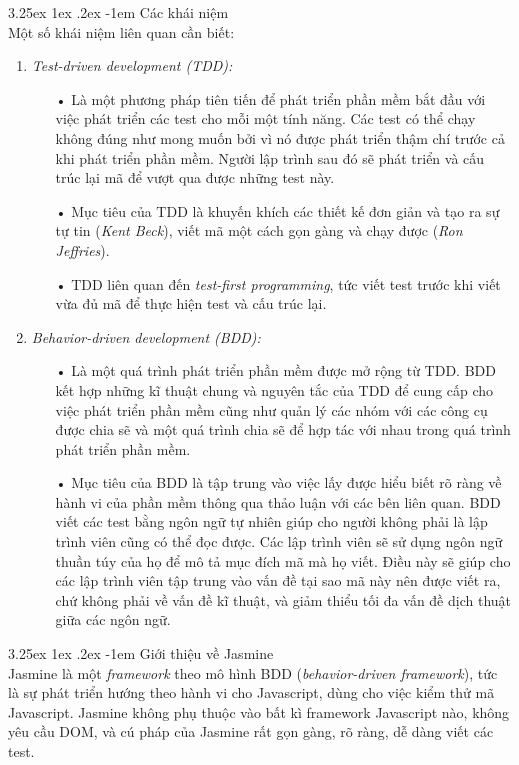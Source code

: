 \documentclass[12pt,a4paper,twoside]{article}
\makeatletter
\let\newcounter\@gobble\let\setcounter\@gobbletwo
\newcommand{\myparagraph}[1]{\paragraph{#1}\mbox{}\\} %
\newcounter{subsubsubsection}[subsubsection]
\renewcommand\paragraph{\@startsection{paragraph}{5}{\z@}%
  {3.25ex \@plus1ex \@minus.2ex}%
  {-1em}%
  {\normalfont\normalsize\bfseries}}
\makeatother
\begin{document}
\myparagraph{Các khái niệm}
Một số khái niệm liên quan cần biết:
\begin{enumerate}
\item \emph{Test-driven development (TDD)\cite{tdd_1}:}
\begin{itemize}
\item[•] Là một phương pháp tiên tiến để phát triển phần mềm bắt đầu với việc phát triển các test cho mỗi một tính năng. Các test có thể chạy không đúng như mong muốn bởi vì nó được phát triển thậm chí trước cả khi phát triển phần mềm. Người lập trình sau đó sẽ phát triển và cấu trúc lại mã để vượt qua được những test này. 
\item[•] Mục tiêu của TDD là khuyến khích các thiết kế đơn giản và tạo ra sự tự tin (\textit{Kent Beck}), viết mã một cách gọn gàng và chạy được (\textit{Ron Jeffries}).
\item[•] TDD liên quan đến \textit{test-first programming}, tức viết test trước khi viết vừa đủ mã để thực hiện test và cấu trúc lại.
\end{itemize}

\item \emph{Behavior-driven development (BDD)\cite{bdd_1}:}
\begin{itemize}
\item[•] Là một quá trình phát triển phần mềm được mở rộng từ TDD. BDD kết hợp những kĩ thuật chung và nguyên tắc của TDD để cung cấp cho việc phát triển phần mềm cũng như quản lý các nhóm với các công cụ được chia sẽ và một quá trình chia sẽ để hợp tác với nhau trong quá trình phát triển phần mềm.
\item[•] Mục tiêu của BDD là tập trung vào việc lấy được hiểu biết rõ ràng về hành vi của phần mềm thông qua thảo luận với các bên liên quan. BDD viết các test bằng ngôn ngữ tự nhiên giúp cho người không phải là lập trình viên cũng có thể đọc được. Các lập trình viên sẽ sử dụng ngôn ngữ thuần túy của họ để mô tả mục đích mã mà họ viết. Điều này sẽ giúp cho các lập trình viên tập trung vào vấn đề tại sao mã này nên được viết ra, chứ không phải về vấn đề kĩ thuật, và giảm thiểu tối đa vấn đề dịch thuật giữa các ngôn ngữ.
\end{itemize}
\end{enumerate}
\myparagraph{Giới thiệu về Jasmine}
Jasmine là một \textit{framework} theo mô hình BDD (\textit{behavior-driven framework}), tức là sự phát triển hướng theo hành vi cho Javascript, dùng cho việc kiểm thử mã Javascript. Jasmine không phụ thuộc vào bất kì framework Javascript nào, không yêu cầu DOM, và cú pháp của Jasmine rất gọn gàng, rõ ràng, dễ dàng viết các test.
\end{document}
